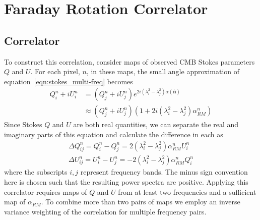 \documentclass[usenatbib,hidelinks]{mnras}
\newcommand{\nhat}{\hat{\mathbf{n}}}
\begin{document}
\section{Faraday Rotation Correlator}\label{sec:correlation detection}{
\subsection{Correlator}{
To construct this correlation, consider maps of observed CMB Stokes parameters $Q$ and $U$. For each pixel, $n$, in these maps, the small angle approximation of equation~\autoref{eqn:stokes_multi-freq} becomes
\begin{equation}
\begin{aligned}
Q_{i}^{n} + i U_{i}^{n} &= (Q_{j}^{n} + iU_{j}^{n})e^{2i(\lambda_{i}^{2}-\lambda_{j}^{2})\alpha(\nhat)} \label{eqn:QUsep}\\
&\approx  (Q_{j}^{n} + iU_{j}^{n})(1+2i(\lambda_{i}^{2}-\lambda_{j}^{2})\alpha_{RM}^{n}) 
\end{aligned}
\end{equation} 
 Since Stokes $Q$ and $U$ are both real quantities, we can separate the real and imaginary parts of this equation and calculate the 
difference in each as
 \begin{equation}
 \begin{aligned}
  \Delta Q_{ij}^{n}= Q_{i}^{n}-Q_{j}^{n}= 2(\lambda_{i}^{2}-\lambda_{j}^{2})\alpha_{RM}^{n} U_{i}^{n}\\
 \Delta U_{ij}^{n}= U_{i}^{n}-U_{j}^{n}= -2(\lambda_{i}^{2}-\lambda_{j}^{2})\alpha_{RM}^{n} Q_{i}^{n} \label{eqn:QUmaps}
 \end{aligned}
 \end{equation}
 where the subscripts $i,j$ represent frequency bands.%
  The minus sign convention here is chosen such that the resulting power spectra are positive. Applying this correlator requires maps of $Q$ and $U$ from at least two frequencies and a sufficient map of $\alpha_{RM}$. 
  To combine more than two pairs of maps we employ an inverse 
  variance weighting of the correlation for multiple frequency pairs.
 

}}
\end{document}
